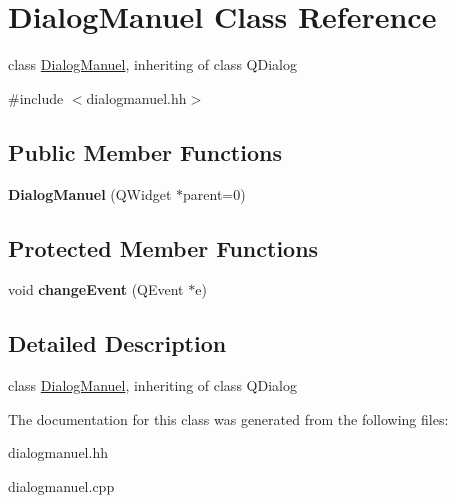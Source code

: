 \hypertarget{classDialogManuel}{
\section{DialogManuel Class Reference}
\label{classDialogManuel}
}


class \hyperlink{classDialogManuel}{DialogManuel}, inheriting of class QDialog  




{\ttfamily \#include $<$dialogmanuel.hh$>$}

\subsection*{Public Member Functions}
\begin{DoxyCompactItemize}
\item 
\hypertarget{classDialogManuel_ab4b4b79e73df6c879d7384a874ed6226}{
{\bfseries DialogManuel} (QWidget $\ast$parent=0)}
\label{classDialogManuel_ab4b4b79e73df6c879d7384a874ed6226}

\end{DoxyCompactItemize}
\subsection*{Protected Member Functions}
\begin{DoxyCompactItemize}
\item 
\hypertarget{classDialogManuel_ac2310eeebe9d185268b5799cecb3a712}{
void {\bfseries changeEvent} (QEvent $\ast$e)}
\label{classDialogManuel_ac2310eeebe9d185268b5799cecb3a712}

\end{DoxyCompactItemize}


\subsection{Detailed Description}
class \hyperlink{classDialogManuel}{DialogManuel}, inheriting of class QDialog 

The documentation for this class was generated from the following files:\begin{DoxyCompactItemize}
\item 
dialogmanuel.hh\item 
dialogmanuel.cpp\end{DoxyCompactItemize}

